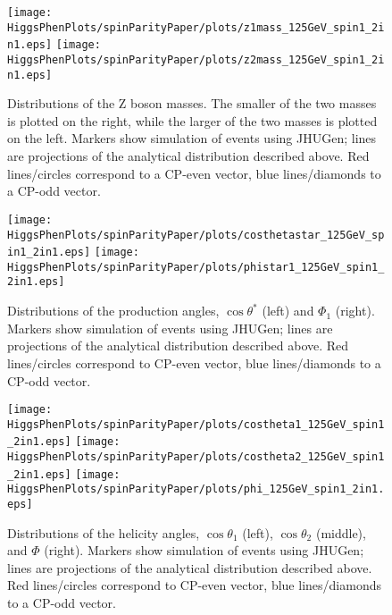 \begin{figure}
\begin{center}
\texttt{[image: HiggsPhenPlots/spinParityPaper/plots/z1mass\_125GeV\_spin1\_2in1.eps]}
\texttt{[image: HiggsPhenPlots/spinParityPaper/plots/z2mass\_125GeV\_spin1\_2in1.eps]}
\caption{Distributions of the Z boson masses.  The smaller of the two masses is
plotted on the right, while the larger of the two masses is plotted on the
left. Markers show simulation of events using JHUGen; lines are projections
of the analytical distribution described above.  Red lines/circles correspond
to a CP-even vector, blue lines/diamonds to a CP-odd vector.}
\label{fig:VectorMasses}
\end{center}
\end{figure}

\begin{figure}
\begin{center}
\texttt{[image: HiggsPhenPlots/spinParityPaper/plots/costhetastar\_125GeV\_spin1\_2in1.eps]}
\texttt{[image: HiggsPhenPlots/spinParityPaper/plots/phistar1\_125GeV\_spin1\_2in1.eps]}
\caption{Distributions of the production angles, $\cos\theta^*$ (left) and 
$\Phi_1$ (right).  Markers show simulation of events using JHUGen; lines 
are projections
of the analytical distribution described above.   Red lines/circles correspond
to CP-even vector, blue lines/diamonds to a CP-odd vector.}
\label{fig:VectorProdAngles}
\end{center}
\end{figure}

\begin{figure}
\begin{center}
\texttt{[image: HiggsPhenPlots/spinParityPaper/plots/costheta1\_125GeV\_spin1\_2in1.eps]}
\texttt{[image: HiggsPhenPlots/spinParityPaper/plots/costheta2\_125GeV\_spin1\_2in1.eps]}
\texttt{[image: HiggsPhenPlots/spinParityPaper/plots/phi\_125GeV\_spin1\_2in1.eps]}
\caption{Distributions of the helicity angles, $\cos\theta_1$ (left), 
$\cos\theta_2$ (middle), and $\Phi$ (right). Markers show simulation of 
events using JHUGen; lines are projections
of the analytical distribution described above.  Red lines/circles correspond
to CP-even vector, blue lines/diamonds to a CP-odd vector.}
\label{fig:VectorHelicityAngles}
\end{center}
\end{figure}

